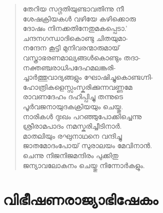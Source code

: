 \begin{verse}
തേറിയ സദ്ഗതിയുണ്ടാവതിന്നു നീ\\
ശേഷക്രിയകള്‍ വഴിയേ കഴിക്കൊരു\\
ദോഷം നിനക്കതിനേതുമകപ്പെടാ.’\\
ചന്ദനഗന്ധാദികൊണ്ടു ചിതയുമാ-\\
നന്ദേന കൂട്ടി മുനിവരന്മാരുമായ്\\
വസ്ത്രാഭരണമാല്യങ്ങള്‍കൊണ്ടും തദാ-\\
നക്തഞ്ചരാധിപദേഹമലങ്കരി-\\
ച്ചാര്‍ത്തുവാദ്യങ്ങളും ഘോഷിച്ചുകൊണ്ടഗ്നി-\\
ഹോത്രികളെസ്സംസ്കരിക്കുന്നവണ്ണമേ\\
രാവണദേഹം ദഹിപ്പിച്ചു തന്നുടെ\\
പൂര്‍വജനായുദകക്രിയയും ചെയ്തു.\\
നാരികള്‍ ദുഃഖം പറഞ്ഞുപോക്കിച്ചെന്നു\\
ശ്രീരാമപാദം നമസ്കരിച്ചീടിനാര്‍.\\
മാതലിയും രഘുനാഥനെ വന്ദിച്ചു\\
ജാതമോദംപോയ് സുരാലയം മേവിനാന്‍.\\
ചെന്നു നിജനിജമന്ദിരം പുക്കിതു\\
ജന്യാവലോകനം ചെയ്തു നിന്നോര്‍കളും.
\end{verse}


\section{വിഭീഷണരാജ്യാഭിഷേകം}

